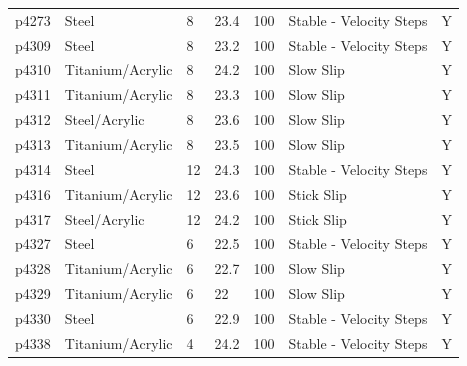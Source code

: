 \documentclass[11pt]{article}
\begin{document}
\begin{center}
\begin{tabular}{ | l l p{1.6cm} p{1.7cm} p{1.6cm} p{4cm} p{0.5cm} | }
p4273      & Steel            & 8                   & 23.4            & 100                   & Stable - Velocity Steps         & Y              \\
p4309      & Steel            & 8                   & 23.2            & 100                   & Stable - Velocity Steps         & Y              \\
p4310      & Titanium/Acrylic & 8                   & 24.2            & 100                   & Slow Slip                       & Y              \\
p4311      & Titanium/Acrylic & 8                   & 23.3            & 100                   & Slow Slip                       & Y              \\
p4312      & Steel/Acrylic    & 8                   & 23.6            & 100                   & Slow Slip                       & Y              \\
p4313      & Titanium/Acrylic & 8                   & 23.5            & 100                   & Slow Slip                       & Y              \\
p4314      & Steel            & 12                  & 24.3            & 100                   & Stable - Velocity Steps         & Y              \\
p4316      & Titanium/Acrylic & 12                  & 23.6            & 100                   & Stick Slip                      & Y              \\
p4317      & Steel/Acrylic    & 12                  & 24.2            & 100                   & Stick Slip                      & Y              \\
p4327      & Steel            & 6                   & 22.5            & 100                   & Stable - Velocity Steps         & Y              \\
p4328      & Titanium/Acrylic & 6                   & 22.7            & 100                   & Slow Slip                       & Y              \\
p4329      & Titanium/Acrylic & 6                   & 22              & 100                   & Slow Slip                       & Y              \\
p4330      & Steel            & 6                   & 22.9            & 100                   & Stable - Velocity Steps         & Y              \\
p4338      & Titanium/Acrylic & 4                   & 24.2            & 100                   & Stable - Velocity Steps         & Y              \\

\end{tabular}
\end{center}
\end{document}
